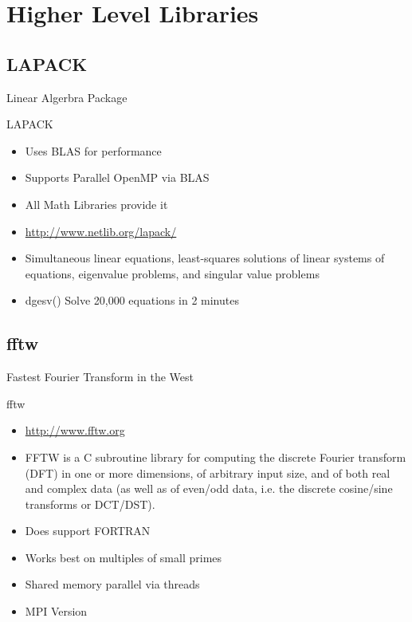 \documentclass[handout]{beamer}
\begin{document}
\section{Higher Level Libraries}
\subsection{LAPACK}
\begin{frame}{Linear Algerbra Package}
 \begin{block}{LAPACK}
  \begin{itemize}
   \item Uses BLAS for performance
   \item Supports Parallel OpenMP via BLAS
   \item All Math Libraries provide it
   \item \url{http://www.netlib.org/lapack/}
   \item Simultaneous linear equations, least-squares solutions of linear systems of equations, eigenvalue problems, and singular value problems
   \item dgesv() Solve 20,000 equations in 2 minutes
  \end{itemize}
 \end{block}
\end{frame}

\subsection{fftw}
\begin{frame}{Fastest Fourier Transform in the West}
 \begin{block}{fftw}
  \begin{itemize}
   \item \url{http://www.fftw.org}
   \item FFTW is a C subroutine library for computing the discrete Fourier transform (DFT) in one or more dimensions, of arbitrary input size, and of both real and complex data (as well as of even/odd data, i.e. the discrete cosine/sine transforms or DCT/DST). 
   \item Does support FORTRAN
   \item Works best on multiples of small primes
   \item Shared memory parallel via threads
   \item MPI Version
  \end{itemize}
 \end{block}
\end{frame}
\end{document}
